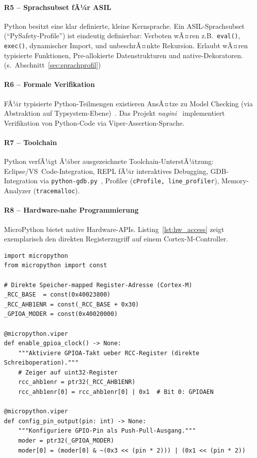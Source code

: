 ﻿\documentclass[12pt,a4paper,twoside]{article}
\begin{document}
\paragraph{R5 -- Sprachsubset fÃ¼r ASIL}
Python besitzt eine klar definierte, kleine Kernsprache.
Ein ASIL-Sprachsubset (``PySafety-Profile'') ist eindeutig definierbar:
Verboten wÃ¤ren z.B.\ \texttt{eval()}, \texttt{exec()}, dynamischer Import,
und unbeschrÃ¤nkte Rekursion. Erlaubt wÃ¤ren typisierte Funktionen,
Pre-allokierte Datenstrukturen und native-Dekoratoren.
(s.~Abschnitt~\ref{sec:sprachprofil})

\paragraph{R6 -- Formale Verifikation}
FÃ¼r typisierte Python-Teilmengen existieren AnsÃ¤tze zu
Model Checking (via Abstraktion auf Typsystem-Ebene)~\cite{gros2021python_types}.
Das Projekt \emph{nagini}~\cite{nagini2018} implementiert
Verifikation von Python-Code via Viper-Assertion-Sprache.

\paragraph{R7 -- Toolchain}
Python verfÃ¼gt Ã¼ber ausgezeichnete Toolchain-UnterstÃ¼tzung:
Eclipse/VS~Code-Integration, REPL fÃ¼r interaktives Debugging,
GDB-Integration via \texttt{python-\newline gdb.py}~\cite{cpython_gdb},
Profiler (\texttt{cProfile, line\_profiler}), Memory-Analyzer (\texttt{tracemalloc}).

\paragraph{R8 -- Hardware-nahe Programmierung}
MicroPython bietet native Hardware-APIs. Listing~\ref{lst:hw_access}
zeigt exemplarisch den direkten Registerzugriff auf einem Cortex-M-Controller.

\begin{lstlisting}[language=MicroPython,caption={Direkter Hardware-Registerzugriff mit MicroPython},label=lst:hw_access]
import micropython
from micropython import const

# Direkte Speicher-mapped Register-Adresse (Cortex-M)
_RCC_BASE  = const(0x40023800)
_RCC_AHB1ENR = const(_RCC_BASE + 0x30)
_GPIOA_MODER = const(0x40020000)

@micropython.viper
def enable_gpioa_clock() -> None:
    """Aktiviere GPIOA-Takt ueber RCC-Register (direkte Schreiboperation)."""
    # Zeiger auf uint32-Register
    rcc_ahb1enr = ptr32(_RCC_AHB1ENR)
    rcc_ahb1enr[0] = rcc_ahb1enr[0] | 0x1  # Bit 0: GPIOAEN

@micropython.viper  
def config_pin_output(pin: int) -> None:
    """Konfiguriere GPIO-Pin als Push-Pull-Ausgang."""
    moder = ptr32(_GPIOA_MODER)
    moder[0] = (moder[0] & ~(0x3 << (pin * 2))) | (0x1 << (pin * 2))
\end{lstlisting}
\end{document}
